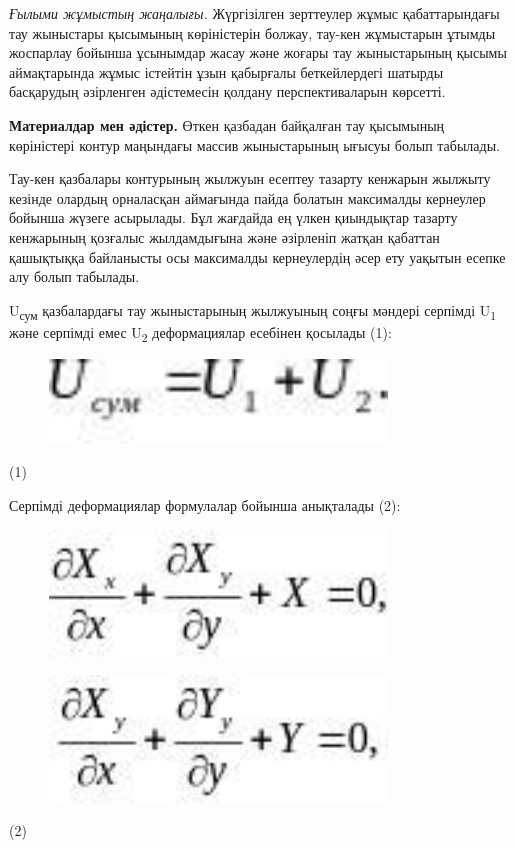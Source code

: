 \emph{Ғылыми жұмыстың жаңалығы.} Жүргізілген зерттеулер жұмыс
қабаттарындағы тау жыныстары қысымының көріністерін болжау, тау-кен
жұмыстарын ұтымды жоспарлау бойынша ұсынымдар жасау және жоғары тау
жыныстарының қысымы аймақтарында жұмыс істейтін ұзын қабырғалы
беткейлердегі шатырды басқарудың әзірленген әдістемесін қолдану
перспективаларын көрсетті.

{\bfseries Материалдар мен әдістер.} Өткен қазбадан байқалған тау қысымының
көріністері контур маңындағы массив жыныстарының ығысуы болып табылады.

Тау-кен қазбалары контурының жылжуын есептеу тазарту кенжарын жылжыту
кезінде олардың орналасқан аймағында пайда болатын максималды кернеулер
бойынша жүзеге асырылады. Бұл жағдайда ең үлкен қиындықтар тазарту
кенжарының қозғалыс жылдамдығына және әзірленіп жатқан қабаттан
қашықтыққа байланысты осы максималды кернеулердің әсер ету уақытын
есепке алу болып табылады.

U\textsubscript{сум} қазбалардағы тау жыныстарының жылжуының соңғы
мәндері серпімді U\textsubscript{1} және серпімді емес
U\textsubscript{2} деформациялар есебінен қосылады (1):

\begin{figure}[H]
	\centering
	\includegraphics[width=0.8\textwidth]{assets/1264}
	\caption*{}
\end{figure} (1)

Серпімді деформациялар формулалар бойынша анықталады (2):

\begin{figure}[H]
	\centering
	\includegraphics[width=0.8\textwidth]{assets/1265}
	\caption*{}
\end{figure}
\begin{figure}[H]
	\centering
	\includegraphics[width=0.8\textwidth]{assets/1266}
	\caption*{}
\end{figure} (2)

